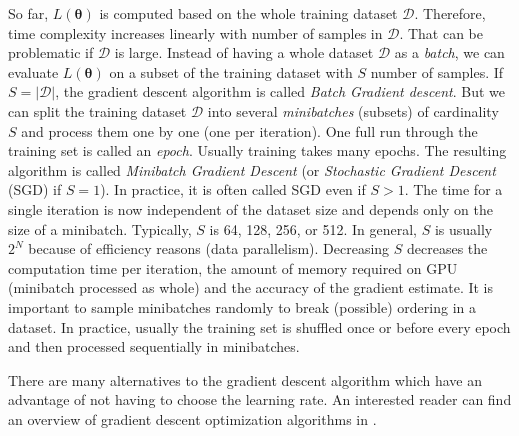 So far, $L(\pmb \theta)$ is computed based on the whole training dataset $\mathcal{D}$. Therefore, time complexity increases linearly with number of samples in $\mathcal{D}$. That can be problematic if $\mathcal{D}$ is large. Instead of having a whole dataset $\mathcal{D}$ as a \textit{batch}, we can evaluate $L(\pmb \theta)$ on a subset of the training dataset with $S$ number of samples. If $S = |\mathcal{D}|$, the gradient descent algorithm is called \textit{Batch Gradient descent}. But we can split the training dataset $\mathcal{D}$ into several \textit{minibatches} (subsets) of cardinality $S$ and process them one by one (one per iteration). One full run through the training set is called an \textit{epoch}. Usually training takes many epochs. The resulting algorithm is called \textit{Minibatch Gradient Descent} (or \textit{Stochastic Gradient Descent} (SGD) if $S = 1$). In practice, it is often called SGD even if $S > 1$. The time for a single iteration is now independent of the dataset size and depends only on the size of a minibatch. Typically, $S$ is 64, 128, 256, or 512. In general, $S$ is usually $2^{N}$ because of efficiency reasons (data parallelism). Decreasing $S$ decreases the computation time per iteration, the amount of memory required on GPU (minibatch processed as whole) and the accuracy of the gradient estimate. It is important to sample minibatches randomly to break (possible) ordering in a dataset. In practice, usually the training set is shuffled once or before every epoch and then processed sequentially in minibatches. 


There are many alternatives to the gradient descent algorithm which have an advantage of not having to choose the learning rate. An interested reader can find an overview of gradient descent optimization algorithms in \cite{gradient-descent-overview}. 



